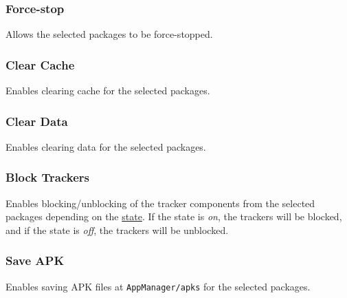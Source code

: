 \subsubsection{Force-stop} %
Allows the selected packages to be force-stopped.

\subsubsection{Clear Cache} %
Enables clearing cache for the selected packages.

\subsubsection{Clear Data} %
Enables clearing data for the selected packages.

\subsubsection{Block Trackers} %
Enables blocking/unblocking of the tracker components from the selected packages depending on the
\hyperref[subsubsec:profile-state]{state}. If the state is \textit{on}, the trackers will be blocked, and if the state
is \textit{off}, the trackers will be unblocked.

\subsubsection{Save APK} %
Enables saving APK files at \texttt{AppManager/apks} for the selected packages.
